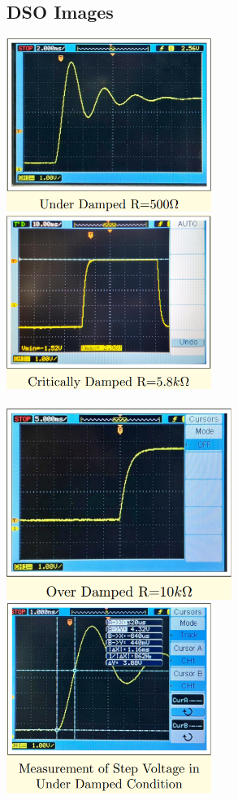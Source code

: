 \documentclass{article}
\begin{document}
\subsection{DSO Images}
    \includegraphics[width=0.5\textwidth]{i10.png}
    \includegraphics[width=0.5\textwidth]{i11.png}\\
    \\
    \includegraphics[width=0.55\textwidth]{i12.png}
    \includegraphics[width=0.5\textwidth]{i13.png}\\
\end{document}
